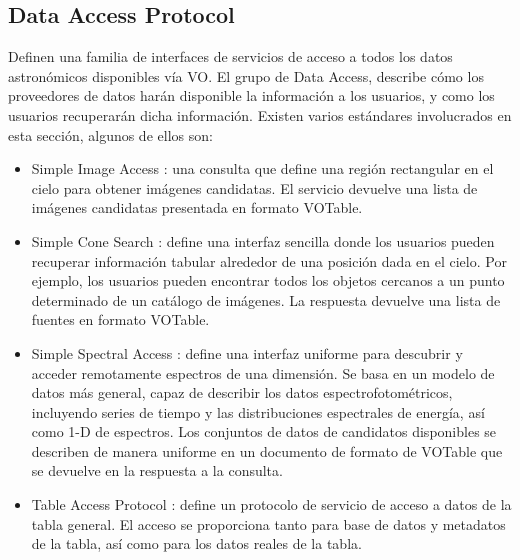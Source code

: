 \subsection{Data Access Protocol}

Definen una familia de interfaces de servicios de acceso a todos los datos
astronómicos disponibles vía VO.  El grupo de Data Access, describe cómo los
proveedores de datos harán disponible la información a los usuarios, y como los
usuarios recuperarán dicha información. Existen varios estándares involucrados
en esta sección, algunos de ellos son:

\begin{itemize}
	\item Simple Image Access \cite{sia}: una consulta que define una región
rectangular en el cielo para obtener imágenes candidatas. El servicio devuelve
una lista de imágenes candidatas presentada en formato VOTable.
	\item Simple Cone Search \cite{scs}: define una interfaz sencilla donde los
usuarios pueden recuperar información tabular alrededor de una posición dada en
el cielo. Por ejemplo, los usuarios pueden encontrar todos los objetos cercanos
a un punto determinado de un catálogo de imágenes. La respuesta devuelve una
lista de fuentes en formato VOTable.
	\item Simple Spectral Access \cite{ssa}: define una interfaz uniforme para
descubrir y acceder remotamente espectros de una dimensión. Se basa en un
modelo de datos más general, capaz de describir los datos espectrofotométricos,
incluyendo series de tiempo y las distribuciones espectrales de energía, así
como 1-D de espectros. Los conjuntos de datos de candidatos disponibles se
describen de manera uniforme en un documento de formato de VOTable que se
devuelve en la respuesta a la consulta.
	\item Table Access Protocol \cite{tap}: define un protocolo de servicio de acceso
a datos de la tabla general. El acceso se proporciona tanto para base de datos
y metadatos de la tabla, así como para los datos reales de la tabla.
\end{itemize}
